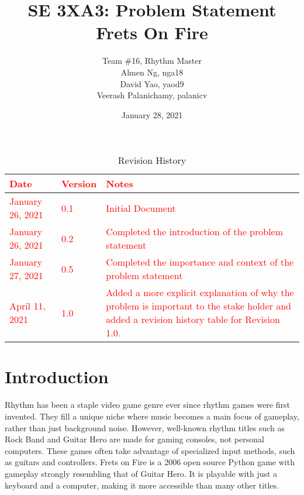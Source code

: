 \documentclass[12pt,letterpaper]{article}
\title{SE 3XA3: Problem Statement\\Frets On Fire}
\author{Team \#16, Rhythm Master
    \\ Almen Ng, nga18
    \\ David Yao, yaod9
    \\ Veerash Palanichamy, palanicv}
\date{January 28, 2021}
\begin{document}
\maketitle

\newpage

\tableofcontents
\listoftables
\listoffigures
\newpage

\begin{table}[h!]
\textcolor{red}{\caption{Revision History}}
\begin{tabularx}{\textwidth}{p{3cm}p{2cm}X}
\toprule {\textcolor{red}{\bf Date}} & {\textcolor{red}{\bf Version}} & {\textcolor{red}{\bf Notes}}\\
\midrule
\textcolor{red}{January 26, 2021} & \textcolor{red}{0.1} & \textcolor{red}{Initial Document} \\
\textcolor{red}{January 26, 2021} & \textcolor{red}{0.2} & \textcolor{red}{Completed the introduction of the problem statement} \\
\textcolor{red}{January 27, 2021} & \textcolor{red}{0.5} & \textcolor{red}{Completed the importance and context of the problem statement} \\
\textcolor{red}{April 11, 2021} & \textcolor{red}{1.0} & \textcolor{red}{Added a more explicit explanation of why the problem is important to the stake holder and added a revision history table for Revision 1.0.}\\
\bottomrule
\end{tabularx}
\end{table}

\newpage

\section{Introduction}
Rhythm has been a staple video game genre ever since rhythm games were first invented. They fill a unique niche where music becomes a main focus of gameplay, rather than just background noise. However, well-known rhythm titles such as Rock Band and Guitar Hero are made for gaming consoles, not personal computers. These games often take advantage of specialized input methods, such as guitars and controllers. Frets on Fire is a 2006 open source Python game with gameplay strongly resembling that of Guitar Hero. It is playable with just a keyboard and a computer, making it more accessible than many other titles.
\end{document}
